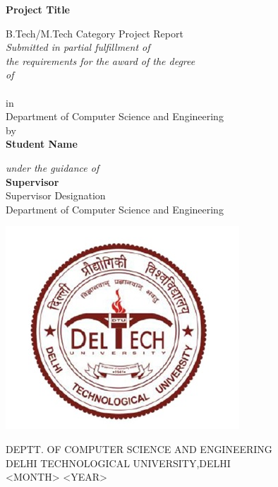 \documentclass[12pt,a4paper]{report}
\date{}
\begin{document}
		
		\begin{titlepage}
				\begin{center}
				\vspace*{0.5cm}
				
				\Huge
				\textbf{Project Title}
				
				\vspace{0.5cm}
				\LARGE
				
					B.Tech/M.Tech Category Project Report\\
									\vspace{0.5cm}
					\textit{Submitted in partial fulfillment of\\
						the requirements for the award of the degree\\
						of\\}
					\\
							in\\
							Department of Computer Science and Engineering\\
						
				by\\
				\textbf{Student Name}
				
				
				\textit{under the guidance of}\\
				\LARGE
				\textbf{Supervisor}\\
				\Large
				Supervisor Designation\\
				Department of Computer Science and Engineering
				
				\vfill
				
				
				\vspace{0.1cm}
				
				\begin{center}
												\includegraphics[scale=0.7]{DTULOGO.jpg}

				\end{center}

				
				\normalsize
				DEPTT. OF COMPUTER SCIENCE AND ENGINEERING\\
				DELHI TECHNOLOGICAL UNIVERSITY,DELHI\\
				<MONTH> <YEAR>
				
			\end{center}
		\end{titlepage}
		
\end{document}
